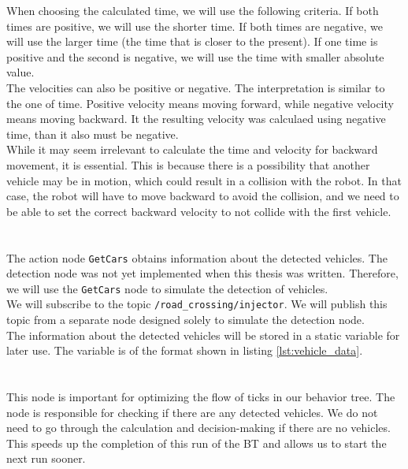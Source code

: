         When choosing the calculated time, we will use the following criteria. If both times are positive, we will use the shorter time. If both times are negative, we will use the larger time (the time that is closer to the present). If one time is positive and the second is negative, we will use the time with smaller absolute value.\\
        The velocities can also be positive or negative. The interpretation is similar to the one of time. Positive velocity means moving forward, while negative velocity means moving backward. It the resulting velocity was calculaed using negative time, than it also must be negative.\\
        While it may seem irrelevant to calculate the time and velocity for backward movement, it is essential. This is because there is a possibility that another vehicle may be in motion, which could result in a collision with the robot. In that case, the robot will have to move backward to avoid the collision, and we need to be able to set the correct backward velocity to not collide with the first vehicle.\\\\
    \\
        The action node \texttt{GetCars} obtains information about the detected vehicles. The detection node was not yet implemented when this thesis was written. Therefore, we will use the \texttt{GetCars} node to simulate the detection of vehicles.\\
        We will subscribe to the topic \texttt{/road\_crossing/injector}. We will publish this topic from a separate node designed solely to simulate the detection node.\\
        The information about the detected vehicles will be stored in a static variable for later use. The variable is of the format shown in listing \ref{lst:vehicle_data}.\\\\
    \\
        This node is important for optimizing the flow of ticks in our behavior tree. The node is responsible for checking if there are any detected vehicles. We do not need to go through the calculation and decision-making if there are no vehicles. This speeds up the completion of this run of the BT and allows us to start the next run sooner.\\\\
    \\
